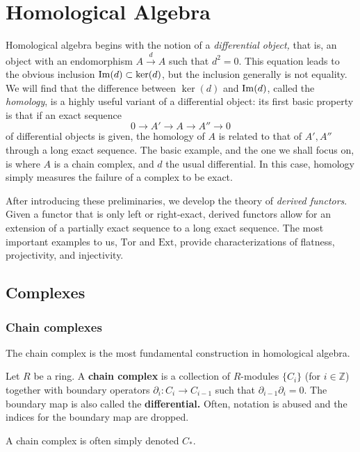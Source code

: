 \chapter{Homological Algebra}
\label{homological}


Homological algebra begins with the notion of a \emph{differential object,}
that is, an object with an endomorphism $A \stackrel{d}{\to} A$ such that $d^2 =
0$. This equation leads to the obvious inclusion $\operatorname{Im}(d) \subset \ker(d)$, but
the inclusion generally is not equality. We will find that the difference
between $\ker(d)$ and $\operatorname{Im}(d)$, called the \emph{homology}, is a highly useful
variant of a differential object: its first basic property is that if an exact
sequence
\[ 0 \to A' \to A \to A'' \to 0  \]
of differential objects is given, the homology of $A$ is related to that of
$A', A''$ through a long exact sequence. The basic example, and the one we
shall focus on, is where $A$ is a
chain complex, and $d$ the usual differential.
In this case, homology simply measures the failure of a complex to be exact.

After introducing these preliminaries, we develop the theory of \emph{derived
functors}. Given a functor that is only left or right-exact, derived functors
allow for an extension of a partially exact sequence to a long exact sequence.
The most important examples to us, $\mathrm{Tor}$ and $\mathrm{Ext}$, provide
characterizations of flatness, projectivity, and injectivity.

\section{Complexes}


\subsection{Chain complexes}
The chain complex is the most fundamental construction in
homological algebra.

\begin{definition} Let $R$ be a ring. A \textbf{chain complex} is a collection
of $R$-modules
$\{C_i\}$ (for $i \in \mathbb{Z}$)
together with boundary
operators
$\partial_i:C_i\rightarrow C_{i-1}$ such that
$\partial_{i-1}\partial_i=0$. The boundary map is also
called the
\textbf{differential.} Often, notation is abused and the indices for
the boundary map are dropped.

A chain complex is often simply denoted $C_*$.
\end{definition}

